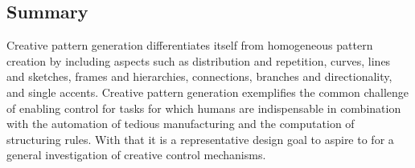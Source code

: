 \subsection{Summary}
\label{subsec:design_summary}

Creative pattern generation differentiates itself from homogeneous pattern creation by including aspects such as distribution and repetition, curves, lines and sketches, frames and hierarchies, connections, branches and directionality, and single accents. Creative pattern generation exemplifies the common challenge of enabling control for tasks for which humans are indispensable in combination with the automation of tedious manufacturing and the computation of structuring rules. With that it is a representative design goal to aspire to for a general investigation of creative control mechanisms.





